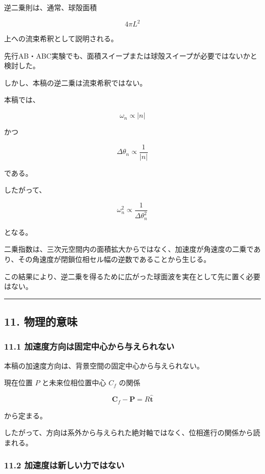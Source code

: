 \documentclass[
  a4paper,
]{ltjsarticle}
\begin{document}
逆二乗則は、通常、球殻面積

\[
4\pi L^2
\]

上への流束希釈として説明される。

先行AB・ABC実験でも、面積スイープまたは球殻スイープが必要ではないかと検討した。

しかし、本稿の逆二乗は流束希釈ではない。

本稿では、

\[
\omega_n\propto|n|
\]

かつ

\[
\Delta\theta_n\propto\frac{1}{|n|}
\]

である。

したがって、

\[
\omega_n^2
\propto
\frac{1}{\Delta\theta_n^2}
\]

となる。

二乗指数は、三次元空間内の面積拡大からではなく、加速度が角速度の二乗であり、その角速度が閉鎖位相セル幅の逆数であることから生じる。

この結果により、逆二乗を得るために広がった球面波を実在として先に置く必要はない。

\begin{center}\rule{0.5\linewidth}{0.5pt}\end{center}

\subsection{11. 物理的意味}\label{ux7269ux7406ux7684ux610fux5473}

\subsubsection{11.1
加速度方向は固定中心から与えられない}\label{ux52a0ux901fux5ea6ux65b9ux5411ux306fux56faux5b9aux4e2dux5fc3ux304bux3089ux4e0eux3048ux3089ux308cux306aux3044}

本稿の加速度方向は、背景空間の固定中心から与えられない。

現在位置 \(P\) と未来位相位置中心 \(C_f\) の関係

\[
\boldsymbol C_f-\boldsymbol P
=R\hat{\boldsymbol t}
\]

から定まる。

したがって、方向は系外から与えられた絶対軸ではなく、位相進行の関係から読まれる。

\subsubsection{11.2
加速度は新しい力ではない}\label{ux52a0ux901fux5ea6ux306fux65b0ux3057ux3044ux529bux3067ux306fux306aux3044}
\end{document}
